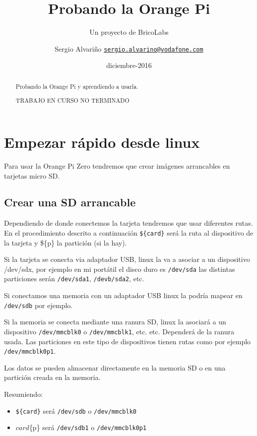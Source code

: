 \documentclass[12pt,spanish,]{scrartcl}
\title{Probando la Orange Pi}
\subtitle{Un proyecto de BricoLabs}
\author{Sergio Alvariño
\href{mailto:sergio.alvarino@vodafone.com}{\nolinkurl{sergio.alvarino@vodafone.com}}}
\institute{BricoLabs}
\date{diciembre-2016}
\providecommand{\tightlist}{%
  \setlength{\itemsep}{0pt}\setlength{\parskip}{0pt}}
\begin{document}
\maketitle
\begin{abstract}
Probando la Orange Pi y aprendiendo a usarla.

TRABAJO EN CURSO NO TERMINADO
\end{abstract}

{
\hypersetup{linkcolor=black}
\setcounter{tocdepth}{3}
\tableofcontents
}
\section{Empezar rápido desde
linux}\label{empezar-ruxe1pido-desde-linux}

Para usar la Orange Pi Zero tendremos que crear imágenes arrancables en
tarjetas micro SD.

\subsection{Crear una SD arrancable}\label{crear-una-sd-arrancable}

Dependiendo de donde conectemos la tarjeta tendremos que usar diferentes
rutas. En el procedimiento descrito a continuación \texttt{\$\{card\}}
será la ruta al dispositivo de la tarjeta y \$\{p\} la partición (si la
hay).

Si la tarjeta se conecta via adaptador USB, linux la va a asociar a un
dispositivo /dev/sdx, por ejemplo en mi portátil el disco duro es
\texttt{/dev/sda} las distintas particiones serán \texttt{/dev/sda1},
\texttt{/devb/sda2}, etc.

Si conectamos una memoria con un adaptador USB linux la podría mapear en
\texttt{/dev/sdb} por ejemplo.

Si la memoria se conecta mediante una ranura SD, linux la asociará a un
dispositivo \texttt{/dev/mmcblk0} o \texttt{/dev/mmcblk1}, etc. etc.
Dependerá de la ranura usada. Las particiones en este tipo de
dispositivos tienen rutas como por ejemplo \texttt{/dev/mmcblk0p1}.

Los datos se pueden almacenar directamente en la memoria SD o en una
partición creada en la memoria.

Resumiendo:

\begin{itemize}
\tightlist
\item
  \texttt{\$\{card\}} será \texttt{/dev/sdb} o \texttt{/dev/mmcblk0}
\item
  \({card}\)\{p\} será \texttt{/dev/sdb1} o \texttt{/dev/mmcblk0p1}
\end{itemize}
\end{document}

